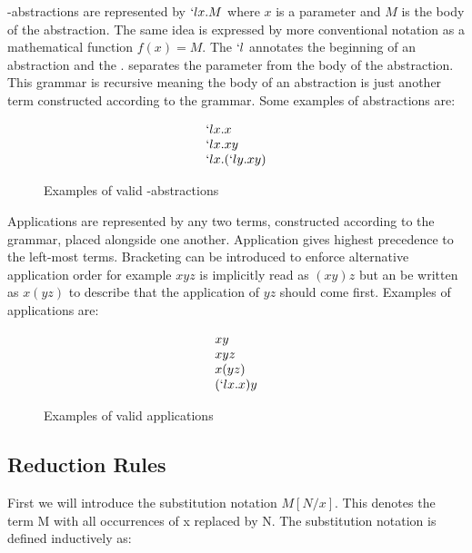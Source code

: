   \lam-abstractions are represented by $`lx.M$ where $x$ is a
  parameter and $M$ is the body of the abstraction. The same idea is
  expressed by more conventional notation as a mathematical function
  $f(x) = M$. The $`l$ annotates the beginning of an abstraction and
  the $.$ separates the parameter from the body of the abstraction.
  This grammar is recursive meaning the body of an abstraction is just
  another term constructed according to the grammar. Some examples of
  abstractions are:
  
  \begin{figure}[!h]
    \[
      \begin{array}{l}
      `lx.x \\
      `lx.xy \\
      `lx.(`ly.xy)
      \end{array}
    \]
  \caption{Examples of valid \lam-abstractions}
  \end{figure}
  
  Applications are represented by any two terms, constructed according to
  the grammar, placed alongside one another. Application gives highest
  precedence to the left-most terms. Bracketing can be introduced to enforce 
  alternative application order for example $xyz$ is implicitly read as 
  $(xy)z$ but an be written as $x(yz)$ to describe that the application of 
  $yz$ should come first. Examples of applications are:
    \begin{figure}[!h]
      \[
        \begin{array}{l}
        xy \\
        xyz \\
        x(yz) \\
        (`lx.x)y
        \end{array}
      \]
    \caption{Examples of valid applications}
    \end{figure}

\subsection{Reduction Rules}

  First we will introduce the substitution notation $M[N/x]$. This denotes 
  the term M with all occurrences of x replaced by N. The substitution 
  notation is defined inductively as:
   
    \begin{figure}[!h]
    \end{figure}

